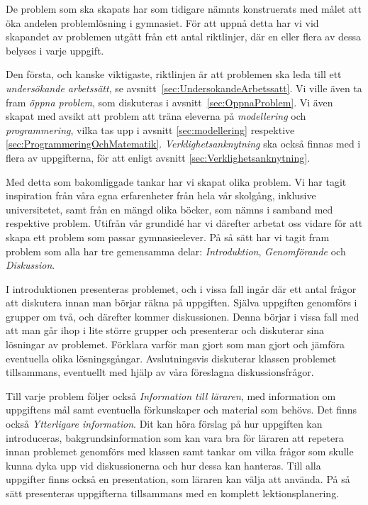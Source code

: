 
    \textcolor{lila}{De problem som ska skapats har som tidigare nämnts konstruerats med målet att öka andelen problemlösning i gymnasiet. För att uppnå detta har vi vid skapandet av problemen utgått från ett antal riktlinjer, där en eller flera av dessa belyses i varje uppgift.}
    
    \textcolor{lila}{Den första, och kanske viktigaste, riktlinjen är att problemen ska leda till ett \textsl{undersökande arbetssätt}, se avsnitt~\ref{sec:UndersokandeArbetssatt}. Vi ville även ta fram \textsl{öppna problem}, som diskuteras i avsnitt~\ref{sec:OppnaProblem}. Vi även skapat med avsikt att problem att träna eleverna på \textsl{modellering} och \textsl{programmering}, vilka tas upp i avsnitt \ref{sec:modellering} respektive \ref{sec:ProgrammeringOchMatematik}. \textsl{Verklighetsanknytning} ska också finnas med i flera av uppgifterna, för att enligt avsnitt \ref{sec:Verklighetsanknytning}.}
    
    \textcolor{lila}{Med detta som bakomliggade tankar har vi skapat olika problem. Vi har tagit inspiration från våra egna erfarenheter från hela vår skolgång, inklusive universitetet, samt från en mängd olika böcker, som nämns i samband med respektive problem. Utifrån vår grundidé har vi därefter arbetat oss vidare för att skapa ett problem som passar gymnasieelever. På så sätt har vi tagit fram problem som alla har tre gemensamma delar: \textsl{Introduktion}, \textsl{Genomförande} och \textsl{Diskussion}.}
    
    \textcolor{lila}{I introduktionen presenteras problemet, och i vissa fall ingår där ett antal frågor att diskutera innan man börjar räkna på uppgiften. Själva uppgiften genomförs i grupper om två, och därefter kommer diskussionen. Denna börjar i vissa fall med att man går ihop i lite större grupper och presenterar och diskuterar sina lösningar av problemet. Förklara varför man gjort som man gjort och jämföra eventuella olika lösningsgångar. Avslutningsvis diskuterar klassen problemet tillsammans, eventuellt med hjälp av våra föreslagna diskussionsfrågor.} 
    
    \textcolor{lila}{Till varje problem följer också \textsl{Information till läraren}, med information om uppgiftens mål samt eventuella förkunskaper och material som behövs. Det finns också \textsl{Ytterligare information}. Dit kan höra förslag på hur uppgiften kan introduceras, bakgrundsinformation som kan vara bra för läraren att repetera innan problemet genomförs med klassen samt tankar om vilka frågor som skulle kunna dyka upp vid diskussionerna och hur dessa kan hanteras. Till alla uppgifter finns också en presentation, som läraren kan välja att använda. På så sätt presenteras uppgifterna tillsammans med en komplett lektionsplanering.}
    
